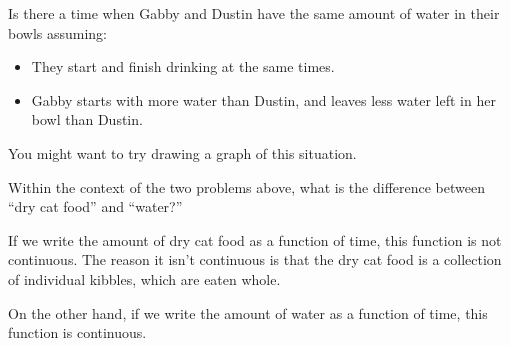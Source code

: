 \documentclass{ximera}
\begin{document}
\begin{problem}
  Is there a time when Gabby and Dustin have the same amount of water in
  their bowls assuming:
  \begin{itemize}
  \item They start and finish drinking at the same times.
  \item Gabby starts with more water than Dustin, and leaves less water
    left in her bowl than Dustin.
  \end{itemize}
    \begin{hint}
  	You might want to try drawing a graph of this situation.
  \end{hint}
    \begin{multipleChoice}
  \end{multipleChoice}
\end{problem}



\begin{problem}
  Within the context of the two problems above, what is the difference
  between ``dry cat food'' and ``water?''
  \begin{freeResponse}
    If we write the amount of dry cat food as a function of time, this function
    is not continuous.  The reason it isn't continuous is that the dry cat food
    is a collection of individual kibbles, which are eaten whole.
    
    On the other hand, if we write the amount of water as a function of time, 
    this function is continuous.
  \end{freeResponse}
\end{problem}


\end{document}
